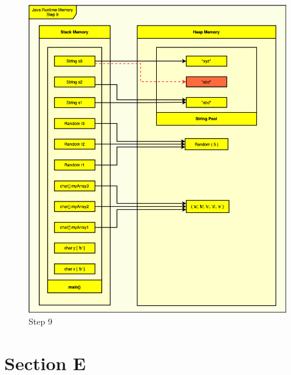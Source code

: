 \documentclass{assignment}
\begin{document}
\begin{figure}[p]
    \centering
    \includegraphics[scale=0.6]{assets/homework2Diagram(9).png}
    \caption{Step 9}
\end{figure}


\newpage
\section*{Section E}

\end{document}
